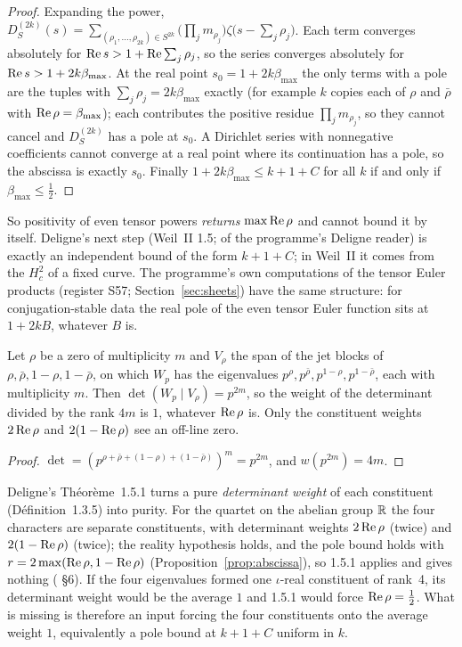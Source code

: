 \begin{proof}
Expanding the power, $D_S^{(2k)}(s)=\sum_{(\rho_1,\dots,\rho_{2k})\in S^{2k}}\big(\prod_jm_{\rho_j}\big)\zeta\big(s-\sum_j\rho_j\big)$. Each term converges absolutely for $\operatorname{Re} s>1+\operatorname{Re}\sum_j\rho_j$, so the series converges absolutely for $\operatorname{Re} s>1+2k\beta_{\max}$.
At the real point $s_0=1+2k\beta_{\max}$ the only terms with a pole are the tuples with $\sum_j\rho_j=2k\beta_{\max}$ exactly (for example $k$ copies each of $\rho$ and $\bar\rho$ with $\operatorname{Re}\rho=\beta_{\max}$); each contributes the positive residue $\prod_jm_{\rho_j}$, so they cannot cancel and $D_S^{(2k)}$ has a pole at $s_0$. A Dirichlet series with nonnegative coefficients cannot converge at a real point where its continuation has a pole, so the abscissa is exactly $s_0$.
Finally $1+2k\beta_{\max}\le k+1+C$ for all $k$ if and only if $\beta_{\max}\le\tfrac12$.
\end{proof}

So positivity of even tensor powers \emph{returns} $\max\operatorname{Re}\rho$ and cannot bound it by itself. Deligne's next step (Weil~II 1.5;  of the programme's Deligne reader) is exactly an independent bound of the form $k+1+C$; in Weil~II it comes from the $H^2_c$ of a fixed curve. The programme's own computations of the tensor Euler products (register S57; Section~\ref{sec:sheets}) have the same structure: for conjugation-stable data the real pole of the even tensor Euler function sits at $1+2kB$, whatever $B$ is.

\begin{proposition}\label{prop:avgweight}
Let $\rho$ be a zero of multiplicity $m$ and $V_\rho$ the span of the jet blocks of $\rho,\bar\rho,1-\rho,1-\bar\rho$, on which $W_p$ has the eigenvalues $p^\rho,p^{\bar\rho},p^{1-\rho},p^{1-\bar\rho}$, each with multiplicity $m$. Then $\det(W_p\mid V_\rho)=p^{2m}$, so the weight of the determinant divided by the rank $4m$ is $1$, whatever $\operatorname{Re}\rho$ is. Only the constituent weights $2\operatorname{Re}\rho$ and $2(1-\operatorname{Re}\rho)$ see an off-line zero.
\end{proposition}

\begin{proof}
$\det=(p^{\rho+\bar\rho+(1-\rho)+(1-\bar\rho)})^m=p^{2m}$, and $w(p^{2m})=4m$.
\end{proof}

Deligne's Théorème~1.5.1 turns a pure \emph{determinant weight} of each constituent (Définition~1.3.5) into purity. For the quartet on the abelian group $\mathbb{R}$ the four characters are separate constituents, with determinant weights $2\operatorname{Re}\rho$ (twice) and $2(1-\operatorname{Re}\rho)$ (twice); the reality hypothesis holds, and the pole bound holds with $r=2\max(\operatorname{Re}\rho,1-\operatorname{Re}\rho)$ (Proposition~\ref{prop:abscissa}), so 1.5.1 applies and gives nothing ( §6). If the four eigenvalues formed one $\iota$-real constituent of rank~4, its determinant weight would be the average $1$ and 1.5.1 would force $\operatorname{Re}\rho=\tfrac12$. What is missing is therefore an input forcing the four constituents onto the average weight $1$, equivalently a pole bound at $k+1+C$ uniform in $k$.

